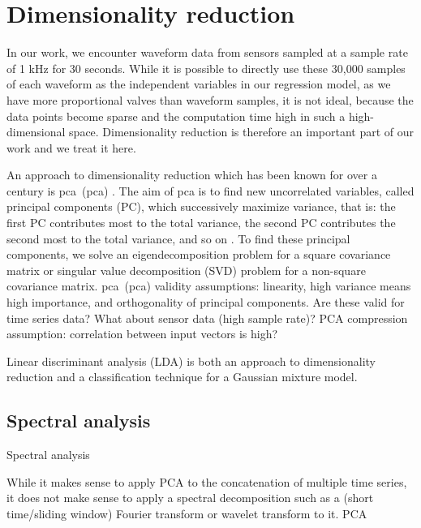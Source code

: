 \section{Dimensionality reduction}

In our work, we encounter waveform data from sensors sampled at a sample rate of 1 kHz for 30 seconds.
While it is possible to directly use these 30,000 samples of each waveform as the independent variables in our regression model, as we have more proportional valves than waveform samples, it is not ideal, because the data points become sparse and the computation time high in such a high-dimensional space.
Dimensionality reduction is therefore an important part of our work and we treat it here.

An approach to dimensionality reduction which has been known for over a century is \acrlong{pca}~(\acrshort{pca}) \citep{doi:10.1080/14786440109462720,hotelling1933analysis}.
The aim of \acrshort{pca} is to find new uncorrelated variables, called principal components (PC), which successively maximize variance, that is: the first PC contributes most to the total variance, the second PC contributes the second most to the total variance, and so on \citep{doi:10.1098/rsta.2015.0202}.
To find these principal components, we solve an eigendecomposition problem for a square covariance matrix or singular value decomposition (SVD) problem for a non-square covariance matrix.
\Acrlong{pca}~(\acrshort{pca}) validity assumptions: linearity, high variance means high importance, and orthogonality of principal components. Are these valid for time series data? What about sensor data (high sample rate)?
PCA compression assumption: correlation between input vectors is high?

Linear discriminant analysis (LDA) \citep{hastie2009elements,mardia1979multivariate} is both an approach to dimensionality reduction and a classification technique for a Gaussian mixture model.

\subsection{Spectral analysis}

Spectral analysis

While it makes sense to apply PCA to the concatenation of multiple time series, it does not make sense to apply a spectral decomposition such as a (short time/sliding window) Fourier transform or wavelet transform to it.
PCA
\citep{DBLP:journals/pvldb/DingTSWK08}

